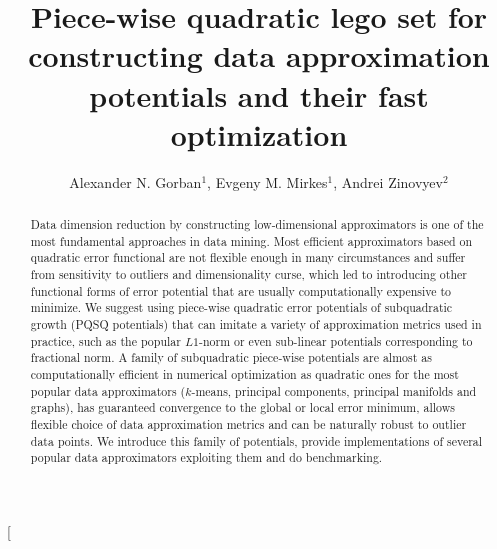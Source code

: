 \documentclass[preprint,12pt,twocolumn]{elsarticle}
\begin{document}
\twocolumn[{\begin{frontmatter}



\title{Piece-wise quadratic lego set for constructing data approximation potentials and their fast optimization}


\author{Alexander N. Gorban$^{1}$, Evgeny M. Mirkes$^{1}$, Andrei Zinovyev$^2$}

\address{$^{1}$ Department of Mathematics, University of Leicester, University Road, Leicester LE1 7RH, UK \\ $^{2}$   Institut Curie, PSL Research University, Mines Paris Tech, Inserm, U900, F-75005, Paris, France. }

\begin{abstract}
Data dimension reduction by constructing low-dimensional approximators is one of the most fundamental approaches in data mining.
Most efficient approximators based on quadratic error functional are not flexible enough in many circumstances and suffer from sensitivity to outliers
and dimensionality curse, which led to introducing other functional forms of error potential that are usually computationally expensive to minimize.
We suggest using piece-wise quadratic error potentials of subquadratic growth (PQSQ potentials) that can imitate a variety
of approximation metrics used in practice, such as the popular $L1$-norm or even sub-linear potentials corresponding to fractional norm.
A family of subquadratic piece-wise potentials are almost as computationally
efficient in numerical optimization as quadratic ones for the most popular data approximators ($k$-means, principal components, principal manifolds and graphs),
has guaranteed convergence to the global or local error minimum, allows flexible choice of data approximation metrics and can be naturally
robust to outlier data points. We introduce this family of potentials, provide implementations of several popular data approximators
exploiting them and do benchmarking.
\end{abstract}


\end{frontmatter}}
\end{document}
